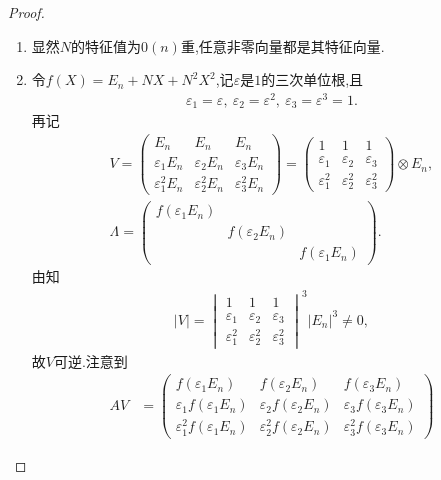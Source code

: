 \documentclass[../../main.tex]{subfiles}%
\begin{document}
\begin{proof}
\begin{enumerate}[(1)]
\item 显然$N$的特征值为$0$$(n)$重,任意非零向量都是其特征向量.

\item 令$f(X) = E_n + NX + N^2X^2$,记$\varepsilon$是$1$的三次单位根,且
\begin{align}
\varepsilon_1 = \varepsilon,\ \varepsilon_2 = \varepsilon^2,\ \varepsilon_3 = \varepsilon^3 = 1.\label{eq:108.98}
\end{align}
再记
\begin{gather*}
V = \begin{pmatrix}
E_n & E_n & E_n\\
\varepsilon_1 E_n & \varepsilon_2 E_n & \varepsilon_3 E_n\\
\varepsilon_1^2 E_n & \varepsilon_2^2 E_n & \varepsilon_3^2 E_n
\end{pmatrix} = \begin{pmatrix}
1 & 1 & 1\\
\varepsilon_1 & \varepsilon_2 & \varepsilon_3\\
\varepsilon_1^2 & \varepsilon_2^2 & \varepsilon_3^2
\end{pmatrix} \otimes E_n, \\
\Lambda = \begin{pmatrix}
f(\varepsilon_1 E_n) & & \\
& f(\varepsilon_2 E_n) & \\
& & f(\varepsilon_1 E_n)
\end{pmatrix}.
\end{gather*}
由知
\begin{align*}
|V| = \begin{vmatrix}
1 & 1 & 1\\
\varepsilon_1 & \varepsilon_2 & \varepsilon_3\\
\varepsilon_1^2 & \varepsilon_2^2 & \varepsilon_3^2
\end{vmatrix}^3 |E_n|^3 \ne 0,
\end{align*}
故$V$可逆.注意到
\begin{align*}
AV &= \begin{pmatrix}
f(\varepsilon_1 E_n) & f(\varepsilon_2 E_n) & f(\varepsilon_3 E_n)\\
\varepsilon_1 f(\varepsilon_1 E_n) & \varepsilon_2 f(\varepsilon_2 E_n) & \varepsilon_3 f(\varepsilon_3 E_n)\\
\varepsilon_1^2 f(\varepsilon_1 E_n) & \varepsilon_2^2 f(\varepsilon_2 E_n) & \varepsilon_3^2 f(\varepsilon_3 E_n)

\end{pmatrix}
\end{align*}
\end{enumerate}
\end{proof}
\end{document}
